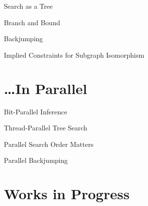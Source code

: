 \documentclass{beamer}
\begin{document}
\begin{frame}{Search as a Tree}
\begin{center}
    \end{center}

\end{frame}

\begin{frame}{Branch and Bound}

\end{frame}

\begin{frame}{Backjumping}

\end{frame}

\begin{frame}{Implied Constraints for Subgraph Isomorphism}

\end{frame}

\section{\ldots{}In Parallel}

\begin{frame}{Bit-Parallel Inference}

\end{frame}

\begin{frame}{Thread-Parallel Tree Search}

\end{frame}

\begin{frame}{Parallel Search Order Matters}

\end{frame}

\begin{frame}{Parallel Backjumping}

\end{frame}

\section{Works in Progress}
\end{document}
